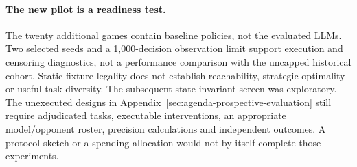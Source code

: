 \paragraph{The new pilot is a readiness test.}
The twenty additional games contain baseline policies, not the evaluated LLMs. Two selected seeds and a 1,000-decision observation limit support execution and censoring diagnostics, not a performance comparison with the uncapped historical cohort. Static fixture legality does not establish reachability, strategic optimality or useful task diversity. The subsequent state-invariant screen was exploratory. The unexecuted designs in Appendix~\ref{sec:agenda-prospective-evaluation} still require adjudicated tasks, executable interventions, an appropriate model/opponent roster, precision calculations and independent outcomes. A protocol sketch or a spending allocation would not by itself complete those experiments.


